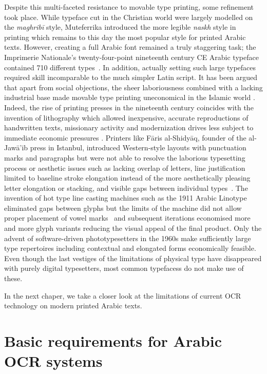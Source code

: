 Despite this multi-faceted resistance to movable type printing, some refinement
took place. While typeface cut in the Christian world were largely modelled on
the \emph{maghribī} style, Muteferrika introduced the more legible \emph{naskh}
style in printing which remains to this day the most popular style for printed
Arabic texts. However, creating a full Arabic font remained a truly staggering
task; the Imprimerie Nationale's twenty-four-point nineteenth century CE Arabic
typeface contained 710 different types~\cite[pg. 218]{bloompaper}. In addition,
actually setting such large typefaces required skill incomparable to the much
simpler Latin script. It has been argued that apart from social objections, the
sheer laboriousness combined with a lacking industrial base made movable type
printing uneconomical in the Islamic world \cite{auji2017neither}. Indeed, the
rise of printing presses in the nineteenth century coincides with the invention
of lithography which allowed inexpensive, accurate reproductions of handwritten
texts, missionary activity and modernization drives less subject to immediate
economic pressures \cite{turner1996dictionary}. Printers like Fāris al-Shidyāq,
founder of the al-Jawā’ib press in Istanbul, introduced Western-style layouts
with punctuation marks and paragraphs but were not able to resolve the
laborious typesetting process or aesthetic issues such as lacking overlap of
letters, line justification limited to baseline stroke elongation instead of
the more aesthetically pleasing letter elongation or stacking, and visible gaps
between individual types~\cite[pg. 605]{blair2006islamic}. The invention of hot
type line casting machines such as the 1911 Arabic Linotype eliminated gaps
between glyphs but the limits of the machine did not allow proper placement of
vowel marks~\cite[pg. 67]{nemeth2017arabic} and subsequent iterations
economised more and more glyph variants reducing the visual appeal of the final
product. Only the advent of software-driven phototypesetters in the 1960s make
sufficiently large type repertoires including contextual and elongated forms
economically feasible. Even though the last vestiges of the limitations of
physical type have disappeared with purely digital typesetters, most common
typefacess do not make use of these.

In the next chaper, we take a closer look at the limitations of current OCR
technology on modern printed Arabic texts.

\section{Basic requirements for Arabic OCR systems}

